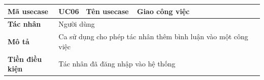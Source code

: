 \documentclass[../DoAn.tex]{subfiles}
\begin{document}
\begin{table}[ht]
    \renewcommand{\arraystretch}{1.2}
    \centering
    \begin{tabular}{| p{0.2\linewidth} | p{0.1\linewidth} | p{0.2\linewidth} | p{0.5\linewidth} |}
        \hline
        \textbf{Mã usecase}                                          & UC06                                                                                              & \textbf{Tên usecase}                                       & Giao công việc                                                                                                                 \\ \hline
        \multicolumn{1}{|p{0.2\linewidth}|}{\textbf{Tác nhân}}       & \multicolumn{3}{p{0.8\linewidth}|}{Người dùng}                                                                                                                                                                                                                                                  \\ \hline
        \multicolumn{1}{|p{0.2\linewidth}|}{\textbf{Mô tả}}          & \multicolumn{3}{p{0.8\linewidth}|}{Ca sử dụng cho phép tác nhân thêm bình luận vào một công việc}                                                                                                                                                                                               \\ \hline
        \multicolumn{1}{|p{0.2\linewidth}|}{\textbf{Tiền điều kiện}} & \multicolumn{3}{p{0.8\linewidth}|}{Tác nhân đã đăng nhập vào hệ thống}                                                                                                                                                                                                                          \\ \hline


\end{tabular}
\end{table}
\end{document}

